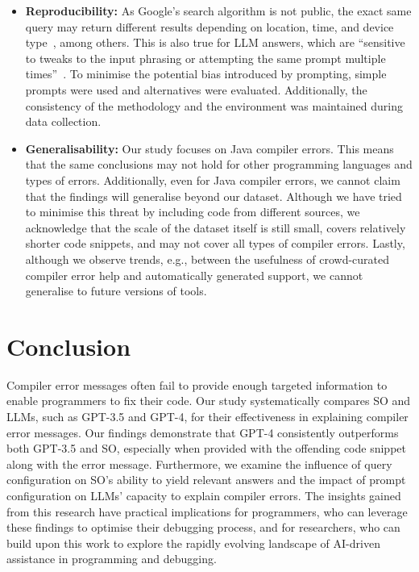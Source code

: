 \documentclass[preprint,12pt]{elsarticle}
\begin{document}
\begin{itemize}
\item\textbf{Reproducibility:} As Google’s search algorithm is not public, the exact same query may return different results depending on location, time, and device type~\cite{google}, among others. This is also true for LLM answers, which are ``sensitive to tweaks to the input phrasing or attempting the same prompt multiple times''~\cite{openai}. To minimise the potential bias introduced by prompting, simple prompts were used and alternatives were evaluated. Additionally, the consistency of the methodology and the environment was maintained during data collection.

\item\textbf{Generalisability:} Our study focuses on Java compiler errors. This means that the same conclusions may not hold for other programming languages and types of errors. Additionally, even for Java compiler errors, we cannot claim that the findings will generalise beyond our dataset. Although we have tried to minimise this threat by including code from different sources, we acknowledge that the scale of the dataset itself is still small, covers relatively shorter code snippets, and may not cover all types of compiler errors. Lastly, although we observe trends, e.g., between the usefulness of crowd-curated compiler error help and automatically generated support, we cannot generalise to future versions of tools.
\end{itemize}

\section{Conclusion}
\label{sec:conclusion}

Compiler error messages often fail to provide enough targeted information to enable programmers to fix their code. Our study systematically compares SO and LLMs, such as GPT-3.5 and GPT-4, for their effectiveness in explaining compiler error messages. Our findings demonstrate that GPT-4 consistently outperforms both GPT-3.5 and SO, especially when provided with the offending code snippet along with the error message. Furthermore, we examine the influence of query configuration on SO's ability to yield relevant answers and the impact of prompt configuration on LLMs' capacity to explain compiler errors. The insights gained from this research have practical implications for programmers, who can leverage these findings to optimise their debugging process, and for researchers, who can build upon this work to explore the rapidly evolving landscape of AI-driven assistance in programming and debugging.
\end{document}
